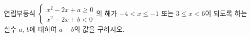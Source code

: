 \hspace*{2mm}\begin{minipage}[t]{\dimexpr\linewidth-2mm\relax}\vspace{0pt}
연립부등식 $\begin{cases} x^2-2x+a\ge 0 \\ x^2-2x+b<0 \end{cases}$의 해가 $-4<x\le -1$ 또는 $3\le x<6$이 되도록 하는 실수 $a$, $b$에 대하여 $a-b$의 값을 구하시오.\end{minipage}
